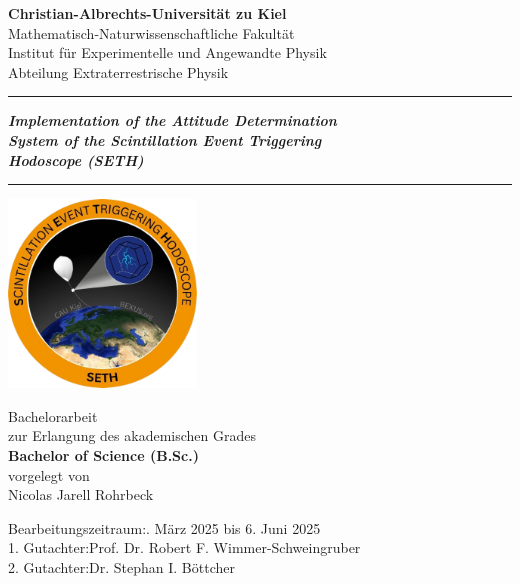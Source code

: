 \begin{titlepage}
\Huge\centering

\textbf{Christian-Albrechts-Universität zu Kiel}\\\LARGE\vspace{0.6cm}
Mathematisch-Naturwissenschaftliche Fakultät\\
\Large\vspace{0.2cm}
Institut für Experimentelle und Angewandte Physik\\\vspace{0.1cm}
Abteilung Extraterrestrische Physik\\\LARGE\vspace{2cm}

\hrule
\textbf{\textit{Implementation of the Attitude Determination\\ System of the Scintillation Event Triggering\\ Hodoscope (SETH)}}
\vspace{0.3cm}
\hrule
\vspace{1cm}

\includegraphics[height=5cm]{images/logo_SETH_v2_nobg.png}

\vspace{0.9cm}

\LARGE
Bachelorarbeit\\\vspace{0.2cm}\Large
zur Erlangung des akademischen Grades\\\vspace{0.2cm}\LARGE
\textbf{Bachelor of Science (B.Sc.)}\\
\large\vspace{1cm}
vorgelegt von\\\vspace{0.2cm}\Large
Nicolas Jarell Rohrbeck

\vspace{1.1cm}
\normalsize
\begin{flushleft}
Bearbeitungszeitraum:. März 2025 bis 6. Juni 2025\\
1. Gutachter:\quad Prof. Dr. Robert F. Wimmer-Schweingruber\\
2. Gutachter:\quad Dr. Stephan I. Böttcher\\
\end{flushleft}

\end{titlepage}
\restoregeometry